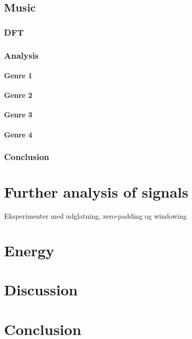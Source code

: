 \subsection{Music}
\subsubsection{DFT}

\subsubsection{Analysis}

\paragraph{Genre 1}

\paragraph{Genre 2}

\paragraph{Genre 3}

\paragraph{Genre 4}

\subsubsection{Conclusion}

\section{Further analysis of signals}
Eksperimenter med udglatning, zero-padding og windowing 

\section{Energy}

\section{Discussion}

\section{Conclusion}
